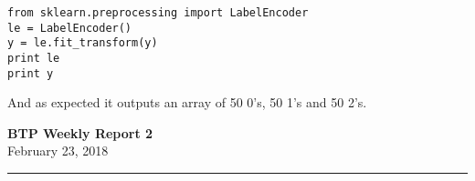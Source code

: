 \documentclass[11pt,letterpaper]{article}
\begin{document}
\begin{lstlisting}
from sklearn.preprocessing import LabelEncoder
le = LabelEncoder()
y = le.fit_transform(y)
print le
print y
\end{lstlisting}

\noindent
And as expected it outputs an array of 50 0's, 50 1's and 50 2's.








\bigskip
\bigskip

\bigskip
\bigskip
\bigskip
\bigskip
\bigskip
\bigskip

\bigskip
\bigskip
\bigskip

\begin{center}\vspace{-1cm}
\textbf{ \large BTP Weekly Report 2}\\
February 23, 2018
\end{center}

\rule{\linewidth}{0.1mm}
\bigskip
\end{document}
